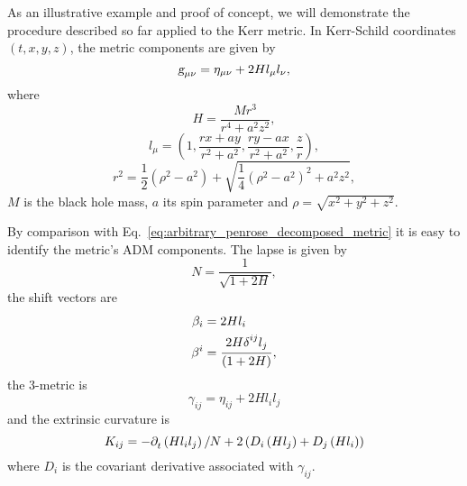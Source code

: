 As an illustrative example and proof of concept, we will demonstrate the procedure described so far applied to the Kerr metric. In Kerr-Schild coordinates $(t,x,y,z)$, the metric components are given by~\cite{PhysRevD.66.084024}
%
\begin{equation}
  \mtrtens{\mu}{\nu} = \eta_{\mu \nu} + 2 H l_\mu l_\nu,
  \label{eq:arbitrary_penrose_kerr_ks_line_element}
\end{equation}
%
where
%
\begin{equation}
  H = \frac{M r^3}{r^4 + a^2 z^2},
  \label{eq:arbitrary_penrose_kerr_ks_H}
\end{equation}
%
\begin{equation}
  l_\mu = \left( 1, \frac{rx + ay}{r^2 + a^2}, \frac{ry - ax}{r^2 + a^2}, \frac{z}{r} \right),
  \label{eq:arbitrary_penrose_kerr_ks_l}
\end{equation}
%
\begin{equation}
  r^2 = \frac{1}{2}\left( \rho^2 - a^2 \right) + \sqrt{\frac{1}{4} \left( \rho^2 - a^2 \right)^2 + a^2z^2},
  \label{eq:arbitrary_penrose_kerr_ks_r}
\end{equation}
%
$M$ is the black hole mass, $a$ its spin parameter and $\rho = \sqrt{x^2 + y^2 + z^2}$.

By comparison with Eq.~\eqref{eq:arbitrary_penrose_decomposed_metric} it is easy to identify the metric's \ac{ADM} components. The lapse is given by~\cite{PhysRevD.66.084024}
%
\begin{equation}
  N = \frac{1}{\sqrt{1 + 2 H}},
  \label{eq:arbitrary_penrose_kerr_ks_lapse}
\end{equation}
%
the shift vectors are
%
\begin{align}
  \beta_i & = 2 H l_i \label{eq:arbitrary_penrose_kerr_ks_l_shift}                                                      \\
  \beta^i & = \frac{2 H \tens{\delta}{ij}{} l_j }{\left( 1 + 2 H \right)}, \label{eq:arbitrary_penrose_kerr_ks_u_shift}
\end{align}
%
the 3-metric is
%
\begin{equation}
  \gamma_{ij} = \eta_{ij} + 2 H l_i l_j
  \label{eq:arbitrary_penrose_kerr_ks_3_metric}
\end{equation}
%
and the extrinsic curvature is
%
\begin{equation}
  K_{ij} = -\indexdel{t}\left( H l_i l_j \right)/N + 2 \left( D_i \left( H l_j \right) + D_j \left( H l_i \right) \right)
  \label{eq:arbitrary_penrose_kerr_ks_3_extrinsic_curvature}
\end{equation}
%
where $D_i$ is the covariant derivative associated with $\gamma_{ij}$.

